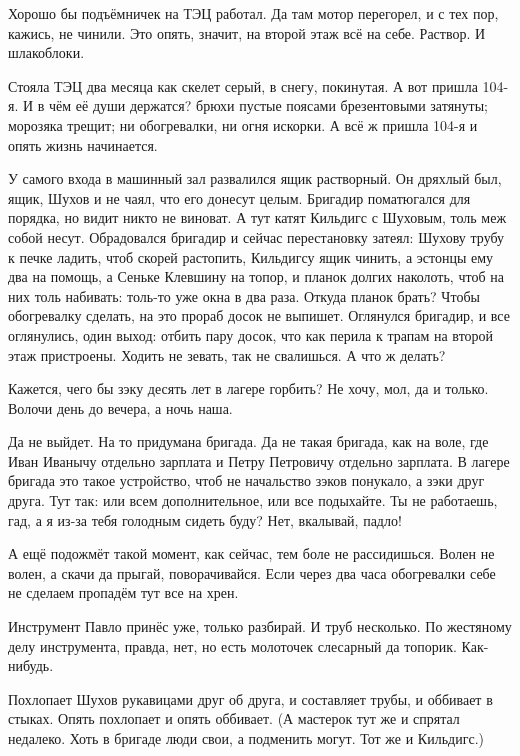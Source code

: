 Хорошо бы подъёмничек на ТЭЦ работал. Да там мотор перегорел, и с тех пор, кажись, не чинили.
Это опять, значит, на второй этаж всё на себе. Раствор. И шлакоблоки.

Стояла ТЭЦ два месяца как скелет серый, в снегу, покинутая. А вот пришла 104-я. И в чём её души
держатся? \dash брюхи пустые поясами брезентовыми затянуты; морозяка трещит; ни обогревалки, ни
огня искорки. А всё ж пришла 104-я \dash и опять жизнь начинается.

У самого входа в машинный зал развалился ящик растворный. Он дряхлый был, ящик, Шухов и не
чаял, что его донесут целым. Бригадир поматюгался для порядка, но видит \dash никто не виноват. А
тут катят Кильдигс с Шуховым, толь меж собой несут. Обрадовался бригадир и сейчас
перестановку затеял: Шухову \dash трубу к печке ладить, чтоб скорей растопить, Кильдигсу \dash ящик
чинить, а эстонцы ему два на помощь, а Сеньке Клевшину \dash на топор, и планок долгих наколоть,
чтоб на них толь набивать: толь-то уже окна в два раза. Откуда планок брать? Чтобы обогревалку
сделать, на это прораб досок не выпишет. Оглянулся бригадир, и все оглянулись, один выход:
отбить пару досок, что как перила к трапам на второй этаж пристроены. Ходить \dash не зевать, так
не свалишься. А что ж делать?

Кажется, чего бы зэку десять лет в лагере горбить? Не хочу, мол, да и только. Волочи день до
вечера, а ночь наша.

Да не выйдет. На то придумана \dash бригада. Да не такая бригада, как на воле, где Иван Иванычу
отдельно зарплата и Петру Петровичу отдельно зарплата. В лагере бригада \dash это такое
устройство, чтоб не начальство зэков понукало, а зэки друг друга. Тут так: или всем
дополнительное, или все подыхайте. Ты не работаешь, гад, а я из-за тебя голодным сидеть буду?
Нет, вкалывай, падло!

А ещё подожмёт такой момент, как сейчас, тем боле не рассидишься. Волен не волен, а скачи да
прыгай, поворачивайся. Если через два часа обогревалки себе не сделаем \dash пропадём тут все на
хрен.

Инструмент Павло принёс уже, только разбирай. И труб несколько. По жестяному делу
инструмента, правда, нет, но есть молоточек слесарный да топорик. Как-нибудь.

Похлопает Шухов рукавицами друг об друга, и составляет трубы, и оббивает в стыках. Опять
похлопает и опять оббивает. (А мастерок тут же и спрятал недалеко. Хоть в бригаде люди свои, а
подменить могут. Тот же и Кильдигс.)

